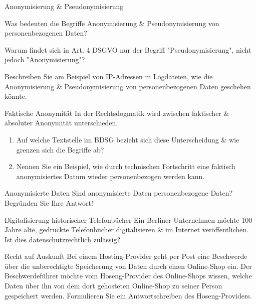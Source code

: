 \documentclass{exercisesheet}
\begin{document}
\begin{exercise}{Anonymisierung \& Pseudonymisierung}
  \item Was bedeuten die Begriffe Anonymisierung \& Pseudonymisierung von personenbezogenen Daten?
  \item Warum findet sich in Art. 4 DSGVO nur der Begriff "Pseudonymisierung", nicht jedoch "Anonymisierung"?
  \item Beschreiben Sie am Beispiel von IP-Adressen in Logdateien, wie die Anonymisierung \& Pseudonymisierung von personenbezogenen Daten geschehen könnte.
\end{exercise}

\begin{exercise*}{Faktische Anonymität}
  In der Rechtsdogmatik wird zwischen faktischer \& absoluter Anonymität unterschieden.
  \begin{enumerate}
    \item Auf welche Textstelle im BDSG bezieht sich diese Unterscheidung \& wie grenzen sich die Begriffe ab?
    \item Nennen Sie ein Beispiel, wie durch technischen Fortschritt eine faktisch anonymisiertes Datum wieder personenbezogen werden kann.
  \end{enumerate}
\end{exercise*}

\begin{exercise*}{Anonymisierte Daten}
  Sind anonymisierte Daten personenbezogene Daten? Begründen Sie Ihre Antwort!
\end{exercise*}

\begin{exercise*}{Digitalisierung historischer Telefonbücher}
  Ein Berliner Unternehmen möchte 100 Jahre alte, gedruckte Telefonbücher digitalisieren \& im Internet veröffentlichen. Ist dies datenschutzrechtlich zulässig?
\end{exercise*}

\begin{exercise*}{Recht auf Auskunft}
  Bei einem Hosting-Provider geht per Post eine Beschwerde über die unberechtigte Speicherung von Daten durch einen Online-Shop ein. Der Beschwerdeführer möchte vom Hoseng-Provider des Online-Shops wissen, welche Daten über ihn von dem dort gehosteten Online-Shop zu seiner Person gespeichert werden. Formulieren Sie ein Antwortschreiben des Hoseng-Providers.
\end{exercise*}
\end{document}
